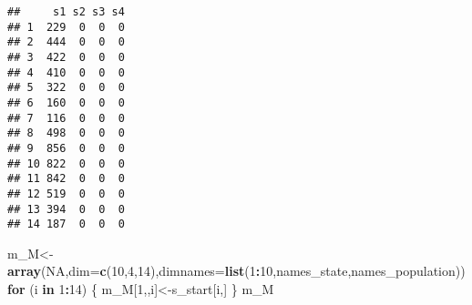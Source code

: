 \documentclass[
]{article}
\newenvironment{Shaded}{\begin{snugshade}}{\end{snugshade}}
\newcommand{\ControlFlowTok}[1]{\textcolor[rgb]{0.13,0.29,0.53}{\textbf{#1}}}
\newcommand{\DataTypeTok}[1]{\textcolor[rgb]{0.13,0.29,0.53}{#1}}
\newcommand{\DecValTok}[1]{\textcolor[rgb]{0.00,0.00,0.81}{#1}}
\newcommand{\KeywordTok}[1]{\textcolor[rgb]{0.13,0.29,0.53}{\textbf{#1}}}
\newcommand{\NormalTok}[1]{#1}
\newcommand{\OperatorTok}[1]{\textcolor[rgb]{0.81,0.36,0.00}{\textbf{#1}}}
\newcommand{\OtherTok}[1]{\textcolor[rgb]{0.56,0.35,0.01}{#1}}
\begin{document}
\begin{verbatim}
##     s1 s2 s3 s4
## 1  229  0  0  0
## 2  444  0  0  0
## 3  422  0  0  0
## 4  410  0  0  0
## 5  322  0  0  0
## 6  160  0  0  0
## 7  116  0  0  0
## 8  498  0  0  0
## 9  856  0  0  0
## 10 822  0  0  0
## 11 842  0  0  0
## 12 519  0  0  0
## 13 394  0  0  0
## 14 187  0  0  0
\end{verbatim}

\begin{Shaded}
\begin{Highlighting}[]
\NormalTok{m_M<-}\KeywordTok{array}\NormalTok{(}\OtherTok{NA}\NormalTok{,}\DataTypeTok{dim=}\KeywordTok{c}\NormalTok{(}\DecValTok{10}\NormalTok{,}\DecValTok{4}\NormalTok{,}\DecValTok{14}\NormalTok{),}\DataTypeTok{dimnames=}\KeywordTok{list}\NormalTok{(}\DecValTok{1}\OperatorTok{:}\DecValTok{10}\NormalTok{,names_state,names_population))}
\ControlFlowTok{for}\NormalTok{ (i }\ControlFlowTok{in} \DecValTok{1}\OperatorTok{:}\DecValTok{14}\NormalTok{) \{}
\NormalTok{  m_M[}\DecValTok{1}\NormalTok{,,i]<-s_start[i,]}
\NormalTok{\}}
\NormalTok{m_M}
\end{Highlighting}
\end{Shaded}
\end{document}
